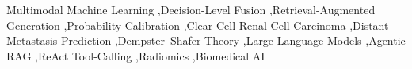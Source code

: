 \documentclass[a4paper,fleqn]{cas-dc}
\begin{document}
\begin{keywords}
Multimodal Machine Learning \sep Decision-Level Fusion \sep Retrieval-Augmented Generation \sep Probability Calibration \sep Clear Cell Renal Cell Carcinoma \sep Distant Metastasis Prediction \sep Dempster--Shafer Theory \sep Large Language Models \sep Agentic RAG \sep ReAct Tool-Calling \sep Radiomics \sep Biomedical AI
\end{keywords}

\maketitle





\FloatBarrier

\FloatBarrier


\FloatBarrier


\end{document}
